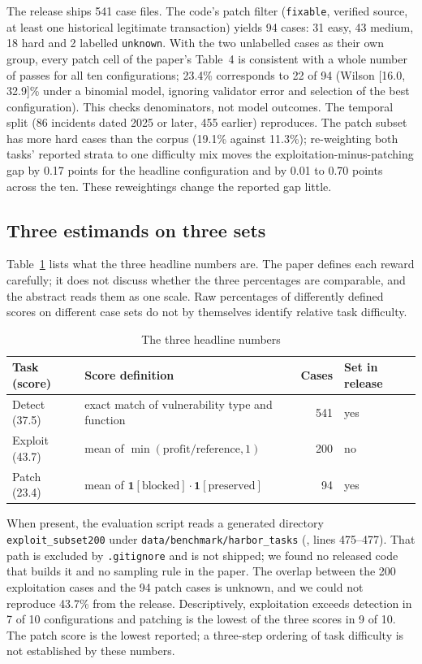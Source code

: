 \documentclass[conference]{IEEEtran}
\newcommand{\code}[1]{\texttt{#1}}
\begin{document}
The release ships 541 case files. The code's patch filter (\code{fixable}, verified source, at least one historical legitimate transaction) yields 94 cases: 31 easy, 43 medium, 18 hard and 2 labelled \code{unknown}. With the two unlabelled cases as their own group, every patch cell of the paper's Table~4 is consistent with a whole number of passes for all ten configurations; 23.4\% corresponds to 22 of 94 (Wilson [16.0, 32.9]\% under a binomial model, ignoring validator error and selection of the best configuration). This checks denominators, not model outcomes. The temporal split (86 incidents dated 2025 or later, 455 earlier) reproduces. The patch subset has more hard cases than the corpus (19.1\% against 11.3\%); re-weighting both tasks' reported strata to one difficulty mix moves the exploitation-minus-patching gap by 0.17 points for the headline configuration and by 0.01 to 0.70 points across the ten. These reweightings change the reported gap little.

\subsection{Three estimands on three sets}
Table~\ref{tab:estimands} lists what the three headline numbers are. The paper defines each reward carefully; it does not discuss whether the three percentages are comparable, and the abstract reads them as one scale. Raw percentages of differently defined scores on different case sets do not by themselves identify relative task difficulty.

\begin{table}[t]
\caption{The three headline numbers}
\label{tab:estimands}
\centering
\footnotesize
\setlength{\tabcolsep}{3pt}
\begin{tabular}{@{}lp{}rl@{}}
\toprule
Task (score) & Score definition & Cases & Set in release \\
\midrule
Detect (37.5) & exact match of vulnerability type and function & 541 & yes \\
Exploit (43.7) & mean of $\min(\text{profit}/\text{reference},1)$ & 200 & no \\
Patch (23.4) & mean of $\mathbf{1}[\text{blocked}]\cdot\mathbf{1}[\text{preserved}]$ & 94 & yes \\
\bottomrule
\end{tabular}
\end{table}

When present, the evaluation script reads a generated directory \code{exploit\_subset200} under \code{data/benchmark/harbor\_tasks} (, lines 475--477). That path is excluded by \code{.gitignore} and is not shipped; we found no released code that builds it and no sampling rule in the paper. The overlap between the 200 exploitation cases and the 94 patch cases is unknown, and we could not reproduce 43.7\% from the release. Descriptively, exploitation exceeds detection in 7 of 10 configurations and patching is the lowest of the three scores in 9 of 10. The patch score is the lowest reported; a three-step ordering of task difficulty is not established by these numbers.
\end{document}
